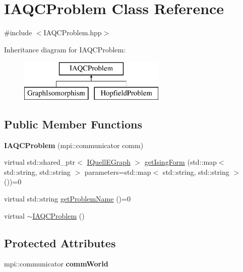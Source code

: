 \hypertarget{a00070}{}\section{I\+A\+Q\+C\+Problem Class Reference}
\label{a00070}


{\ttfamily \#include $<$I\+A\+Q\+C\+Problem.\+hpp$>$}

Inheritance diagram for I\+A\+Q\+C\+Problem\+:\begin{figure}[H]
\begin{center}
\leavevmode
\includegraphics[height=2.000000cm]{a00070}
\end{center}
\end{figure}
\subsection*{Public Member Functions}
\begin{DoxyCompactItemize}
\item 
{\bfseries I\+A\+Q\+C\+Problem} (mpi\+::communicator comm)\hypertarget{a00070_a1be1e8872cca48daf6fadca97e4ee6da}{}\label{a00070_a1be1e8872cca48daf6fadca97e4ee6da}

\item 
virtual std\+::shared\+\_\+ptr$<$ \hyperlink{a00076}{I\+Quell\+E\+Graph} $>$ \hyperlink{a00070_a9249fffc88888fe380449eb0ba91370a}{get\+Ising\+Form} (std\+::map$<$ std\+::string, std\+::string $>$ parameters=std\+::map$<$ std\+::string, std\+::string $>$())=0
\item 
virtual std\+::string \hyperlink{a00070_a7a9b51abf3ac37c5388cdd4f179d43ea}{get\+Problem\+Name} ()=0
\item 
virtual \hyperlink{a00070_a07188ab60a3af607fc656bd06f25f2ef}{$\sim$\+I\+A\+Q\+C\+Problem} ()
\end{DoxyCompactItemize}
\subsection*{Protected Attributes}
\begin{DoxyCompactItemize}
\item 
mpi\+::communicator {\bfseries comm\+World}\hypertarget{a00070_a07463b104572e3d63dcf39b416f8701e}{}\label{a00070_a07463b104572e3d63dcf39b416f8701e}

\end{DoxyCompactItemize}



